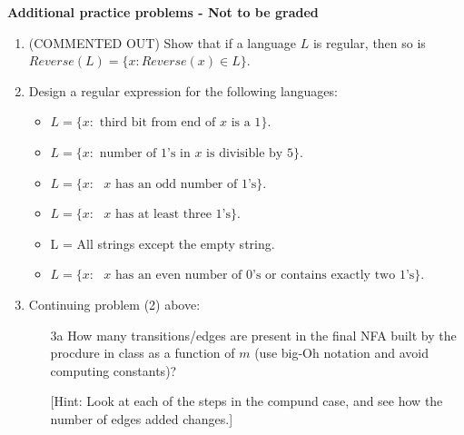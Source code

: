 \documentclass[11pt]{article}
\begin{document}
{\bf Additional practice problems - Not to be graded}

\begin{enumerate}
\item (COMMENTED OUT) Show that if a language $L$ is regular, then so is $Reverse(L) = \{x: Reverse(x) \in L\}$. 

\item Design a regular expression for the following languages: 
\begin{itemize}
\item $L = \{x: \text{ third bit from end of $x$ is a 1}\}$.
\item $L = \{x: \text{ number of $1$'s in $x$ is divisible by $5$}\}$.
\item $L = \{x: \text{ $x$ has an odd number of $1$'s}\}$. 
\item $L = \{x: \text{ $x$ has at least three $1$'s}\}$.
\item L = All strings except the empty string.
\item $L = \{x: \text{ $x$ has an even number of $0$'s or contains exactly two $1$'s}\}$.
\end{itemize}

\item Continuing problem (2) above:
\begin{enumerate}
\item[3a] How many transitions/edges are present in the final NFA built by the procdure in class as a function of $m$ (use big-Oh notation and avoid computing constants)?

[Hint: Look at each of the steps in the compund case, and see how the number of edges added changes.] 


\end{enumerate}
\end{enumerate}
\end{document}
